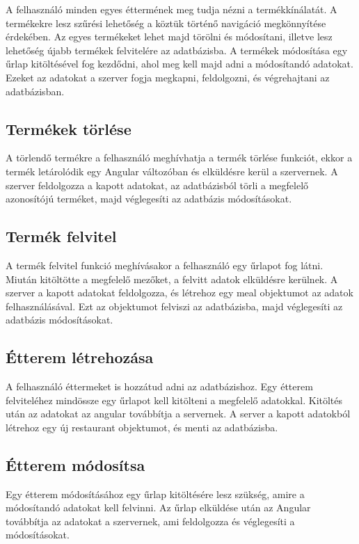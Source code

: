 A felhasználó minden egyes éttermének meg tudja nézni a termékkínálatát. A termékekre lesz szűrési lehetőség a köztük történő navigáció megkönnyítése érdekében. Az egyes termékeket lehet majd törölni és módosítani, illetve lesz lehetőség újabb termékek felvitelére az adatbázisba.
A termékek módosítása egy űrlap kitöltésével fog kezdődni, ahol meg kell majd adni a módosítandó adatokat. Ezeket az adatokat a szerver fogja megkapni, feldolgozni, és végrehajtani az adatbázisban.

\subsection{Termékek törlése}

A törlendő termékre a felhasználó meghívhatja a termék törlése funkciót, ekkor a termék letárolódik egy Angular változóban és elküldésre kerül a szervernek. A szerver feldolgozza a kapott adatokat, az adatbázisból törli a megfelelő azonosítójú terméket, majd véglegesíti az adatbázis módosításokat.

\subsection{Termék felvitel}

A termék felvitel funkció meghívásakor a felhasználó egy űrlapot fog látni. Miután kitöltötte a megfelelő mezőket, a felvitt adatok elküldésre kerülnek. A szerver a kapott adatokat feldolgozza, és létrehoz egy meal objektumot az adatok felhasználásával. Ezt az objektumot felviszi az adatbázisba, majd véglegesíti az adatbázis módosításokat.

\subsection{Étterem létrehozása}

A felhasználó éttermeket is hozzátud adni az adatbázishoz. Egy étterem felviteléhez mindössze egy űrlapot kell kitölteni a megfelelő adatokkal. Kitöltés után az adatokat az angular továbbítja a servernek. A server a kapott adatokból létrehoz egy új restaurant objektumot, és menti az adatbázisba.

\subsection{Étterem módosítsa}

Egy étterem módosításához egy űrlap kitöltésére lesz szükség, amire a módosítandó adatokat kell felvinni. Az űrlap elküldése után az Angular továbbítja az adatokat a szervernek, ami feldolgozza és véglegesíti a módosításokat.

